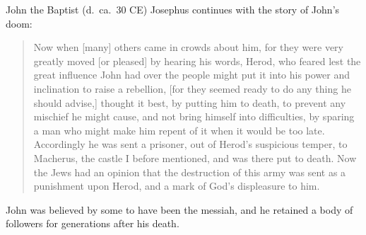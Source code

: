\documentclass[8pt]{article}
\newcommand{\quotesize}{\large{}}
\newenvironment{quotetext}{\begin{quote}\quotesize}{\end{quote}}
\begin{document}
\begin{section}{John the Baptist (d.~ca.~30 CE)}
Josephus continues with the story of John's doom:

\begin{quotetext}
Now when [many] others came in crowds about him, for
they were very greatly moved [or pleased] by hearing his words, Herod,
who feared lest the great influence John had over the people might put
it into his power and inclination to raise a rebellion, [for they
seemed ready to do any thing he should advise,] thought it best, by
putting him to death, to prevent any mischief he might cause, and not
bring himself into difficulties, by sparing a man who might make him
repent of it when it would be too late. Accordingly he was sent a
prisoner, out of Herod's suspicious temper, to Macherus, the castle I
before mentioned, and was there put to death. Now the Jews had an
opinion that the destruction of this army was sent as a punishment
upon Herod, and a mark of God's displeasure to him.
\end{quotetext}

John was believed by some to have been the messiah, and he retained a body of followers for
generations after his death.



\end{section}
\end{document}

